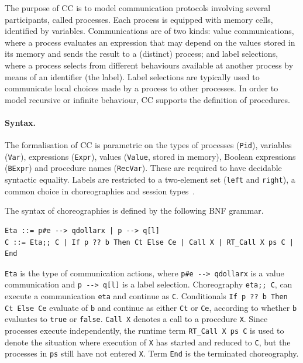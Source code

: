 \documentclass[runningheads]{llncs}
\begin{document}
The purpose of CC is to model communication protocols involving several participants, called processes.
Each process is equipped with memory cells, identified by variables.
Communications are of two kinds: value communications, where a process evaluates an expression that
may depend on the values stored in its memory and sends the result to a (distinct) process; and
label selections, where a process selects from different behaviours available at another process by means of an identifier (the label).
Label selections are typically used to communicate local choices made by a process to other processes.
In order to model recursive or infinite behaviour, CC supports the definition of procedures.

\paragraph{Syntax.}
The formalisation of CC is parametric on the types of processes (\lstinline!Pid!), variables
(\lstinline!Var!), expressions (\lstinline!Expr!), values (\lstinline!Value!,
stored in memory), Boolean expressions (\lstinline!BExpr!)
and procedure
names (\lstinline!RecVar!).
These are required to have decidable syntactic equality.
Labels are restricted to a two-element set (\lstinline!left! and
\lstinline!right!), a common choice in choreographies and session types~\cite{CP10,CLMSW16,CMS18,W14}.

The syntax of choreographies is defined by the following BNF grammar.
\begin{lstlisting}
Eta ::= p#e --> qdollarx | p --> q[l]
C ::= Eta;; C | If p ?? b Then Ct Else Ce | Call X | RT_Call X ps C | End
\end{lstlisting}
\lstinline!Eta! is the type of communication actions, where \lstinline+p#e --> qdollarx+ is a value communication and \lstinline+p --> q[l]+ is a label selection.
Choreography \lstinline!eta;; C!, can execute a communication \lstinline!eta! and continue as \lstinline!C!.
Conditionals \lstinline+If p ?? b Then Ct Else Ce+ evaluate of \lstinline+b+ and continue as either \lstinline+Ct+ or \lstinline+Ce+, according to whether \lstinline+b+ evaluates to \lstinline+true+ or \lstinline+false+.
\lstinline+Call X+ denotes a call to a procedure \lstinline+X+.
Since processes execute independently, the runtime term \lstinline+RT_Call X ps C+ is used to denote
the situation where execution of \lstinline+X+ has started and reduced to \lstinline+C+, but the
processes in \lstinline+ps+ still have not entered \lstinline+X+.
Term \lstinline+End+ is the terminated choreography.
\end{document}
